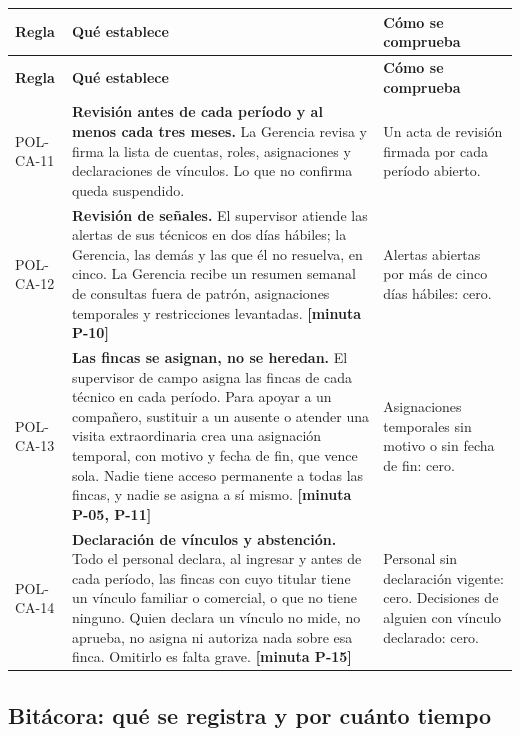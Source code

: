 \documentclass[11pt,letterpaper]{article}
\newcommand{\cab}[1]{\textbf{\rmfamily #1}}
\newcommand{\resp}[1]{\textrm{\footnotesize\bfseries [minuta #1]}}
\begin{document}
{\small
\renewcommand{\arraystretch}{1.14}
\begin{longtable}{@{}L{1.7cm} L{9.2cm} L{4.8cm}@{}}
\toprule
\cab{Regla} & \cab{Qué establece} & \cab{Cómo se comprueba} \\
\midrule
\endfirsthead
\toprule
\cab{Regla} & \cab{Qué establece} & \cab{Cómo se comprueba} \\
\midrule
\endhead
\bottomrule
\endfoot
POL-CA-11 & \textbf{Revisión antes de cada período y al menos cada tres meses.} La Gerencia revisa y firma la lista de cuentas, roles, asignaciones y declaraciones de vínculos. Lo que no confirma queda suspendido. & Un acta de revisión firmada por cada período abierto. \\
POL-CA-12 & \textbf{Revisión de señales.} El supervisor atiende las alertas de sus técnicos en dos días hábiles; la Gerencia, las demás y las que él no resuelva, en cinco. La Gerencia recibe un resumen semanal de consultas fuera de patrón, asignaciones temporales y restricciones levantadas. \resp{P-10} & Alertas abiertas por más de cinco días hábiles: cero. \\
POL-CA-13 & \textbf{Las fincas se asignan, no se heredan.} El supervisor de campo asigna las fincas de cada técnico en cada período. Para apoyar a un compañero, sustituir a un ausente o atender una visita extraordinaria crea una asignación temporal, con motivo y fecha de fin, que vence sola. Nadie tiene acceso permanente a todas las fincas, y nadie se asigna a sí mismo. \resp{P-05, P-11} & Asignaciones temporales sin motivo o sin fecha de fin: cero. \\
POL-CA-14 & \textbf{Declaración de vínculos y abstención.} Todo el personal declara, al ingresar y antes de cada período, las fincas con cuyo titular tiene un vínculo familiar o comercial, o que no tiene ninguno. Quien declara un vínculo no mide, no aprueba, no asigna ni autoriza nada sobre esa finca. Omitirlo es falta grave. \resp{P-15} & Personal sin declaración vigente: cero. Decisiones de alguien con vínculo declarado: cero. \\
\end{longtable}
}

\subsection{Bitácora: qué se registra y por cuánto tiempo}
\end{document}
